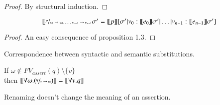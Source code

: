 \documentclass{article}[12pt]
\begin{document}
\begin{proof}
    By structural induction.
\end{proof}
\begin{proposition}
    \[\llbracket \sfrac{p}{v_0 \rightarrow e_0, \ldots, v_{n-1} \rightarrow e_{n-1}}\sigma' = \llbracket p \rrbracket [\sigma'|v_0:\llbracket e_0 \rrbracket \sigma' | \ldots | v_{n-1}:\llbracket e_{n-1}\rrbracket \sigma']\]
\end{proposition}
\begin{proof}
    An easy consequence of proposition 1.3.
\end{proof}
Correspondence between syntactic and semantic substitutions.
\begin{proposition}[Renaming]
    If $\omega \notin FV_{assert}(q)\setminus \{v\}$ \\
    then $\llbracket \forall \omega. (\sfrac{q}{v\rightarrow \omega})\rrbracket = \llbracket \forall v. q \rrbracket$
\end{proposition}
Renaming doesn't change the meaning of an assertion.
\end{document}
